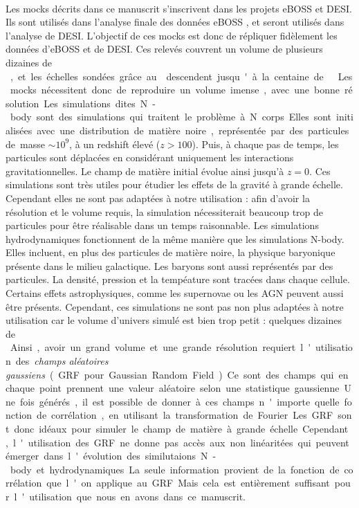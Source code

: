 \documentclass[11pt, twoside, a4paper, openright]{report}
\begin{document}
\paragraph{}
Les mocks décrits dans ce manuscrit s'inscrivent dans les projets eBOSS et DESI. Ils sont utilisés dans l'analyse \lya{} finale des données eBOSS \citep{CITE:dr16}, et seront utilisés dans l'analyse \lya{} de DESI.
L'objectif de ces mocks est donc de répliquer fidèlement les données \lya{} d'eBOSS et de DESI. Ces relevés couvrent un volume de plusieurs dizaines de \si{\perh\cubic\Gpc}, et les échelles sondées grâce au \lya{} descendent jusqu'à la centaine de \si{\perh\kpc}. Les mocks nécessitent donc de reproduire un volume imense, avec une bonne résolution.
Les simulations dites N-body sont des simulations qui traitent le problème à N corps. Elles sont initialisées avec une distribution de matière noire, représentée par des particules de masse $\sim 10^{9}$, à un redshift élevé ($z > 100$). Puis, à chaque pas de temps, les particules sont déplacées en considérant uniquement les interactions gravitationnelles. Le champ de matière initial évolue ainsi jusqu'à $z=0$. Ces simulations sont très utiles pour étudier les effets de la gravité à grande échelle. Cependant elles ne sont pas adaptées à notre utilisation : afin d'avoir la résolution et le volume requis, la simulation nécessiterait beaucoup trop de particules pour être réalisable dans un temps raisonnable.
Les simulations hydrodynamiques fonctionnent de la même manière que les simulations N-body. Elles incluent, en plus des particules de matière noire, la physique baryonique présente dans le milieu galactique. Les baryons sont aussi représentés par des particules. La densité, pression et la tempéature sont tracées dans chaque cellule. Certains effets astrophysiques, comme les supernovae ou les AGN peuvent aussi être présents. Cependant, ces simulations ne sont pas non plus adaptées à notre utilisation car le volume d'univers simulé est bien trop petit : quelques dizaines de \si{\perh\cubic\Mpc}.
Ainsi, avoir un grand volume et une grande résolution requiert l'utilisation des \emph{champs aléatoires gaussiens} (GRF pour Gaussian Random Field). Ce sont des champs qui en chaque point prennent une valeur aléatoire selon une statistique gaussienne. Une fois générés, il est possible de donner à ces champs n'importe quelle fonction de corrélation, en utilisant la transformation de Fourier. Les GRF sont donc idéaux pour simuler le champ de matière à grande échelle. Cependant, l'utilisation des GRF ne donne pas accès aux non linéaritées qui peuvent émerger dans l'évolution des similutaions N-body et hydrodynamiques. La seule information provient de la fonction de corrélation que l'on applique au GRF. Mais cela est entièrement suffisant pour l'utilisation que nous en avons dans ce manuscrit.




\end{document}
